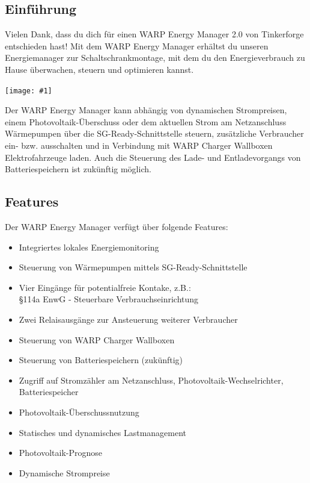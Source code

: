 \documentclass[a4paper,10pt]{article}
\newcommand{\gfx}[1]{\texttt{[image: \#1]}}
\begin{document}
\begin{multicols*}{2}
	\tableofcontents
	\newpage
	\section{Einführung}
	Vielen Dank, dass du dich für einen WARP Energy Manager 2.0 von Tinkerforge entschieden hast!
	Mit dem WARP Energy Manager
	erhältst du unseren Energiemanager zur Schaltschrankmontage, mit dem du den
	Energieverbrauch zu Hause überwachen, steuern und optimieren kannst.

	\gfx{./img_v2/warp-energy-manager2.png}

	Der WARP Energy Manager kann abhängig von dynamischen Strompreisen, einem Photovoltaik-Überschuss oder dem aktuellen Strom am Netzanschluss
    Wärmepumpen über die SG-Ready-Schnittstelle steuern, zusätzliche Verbraucher ein- bzw. ausschalten und in Verbindung mit WARP Charger Wallboxen
    Elektrofahrzeuge laden. Auch die Steuerung des Lade- und Entladevorgangs von Batteriespeichern ist zukünftig möglich.

	\subsection{Features}
	Der WARP Energy Manager verfügt über folgende Features:

    \begin{itemize}
        \item Integriertes lokales Energiemonitoring
        \item Steuerung von Wärmepumpen mittels SG-Ready-Schnittstelle
        \item Vier Eingänge für potentialfreie Kontake, z.B.:\\ \S114a EnwG - Steuerbare Verbrauchseinrichtung
        \item Zwei Relaisausgänge zur Ansteuerung weiterer Verbraucher
        \item Steuerung von WARP Charger Wallboxen
		\item Steuerung von Batteriespeichern (zukünftig)
        \item Zugriff auf Stromzähler am Netzanschluss, Photovoltaik-Wechselrichter, Batteriespeicher
        \item Photovoltaik-Überschussnutzung
        \item Statisches und dynamisches Lastmanagement
        \item Photovoltaik-Prognose
        \item Dynamische Strompreise
    \end{itemize}


\end{multicols*}
\end{document}
